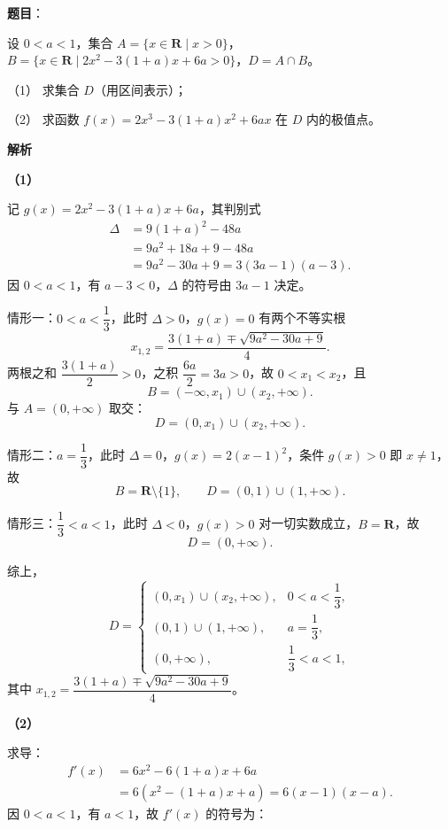 \begin{answer}

\textbf{题目}：

设 $0<a<1$，集合 $A=\{x\in\mathbf R\mid x>0\}$，$B=\{x\in\mathbf R\mid 2x^2-3(1+a)x+6a>0\}$，$D=A\cap B$。

（1） 求集合 $D$（用区间表示）；

（2） 求函数 $f(x)=2x^3-3(1+a)x^2+6ax$ 在 $D$ 内的极值点。

\textbf{解析}

\textbf{（1）}

记 $g(x)=2x^2-3(1+a)x+6a$，其判别式
\nopagebreak[4]
\[\begin{aligned}
\Delta&=9(1+a)^2-48a\\
&=9a^2+18a+9-48a\\
&=9a^2-30a+9=3(3a-1)(a-3).
\end{aligned}\]
因 $0<a<1$，有 $a-3<0$，$\Delta$ 的符号由 $3a-1$ 决定。

情形一：$0<a<\dfrac13$，此时 $\Delta>0$，$g(x)=0$ 有两个不等实根
\nopagebreak[4]
\[x_{1,2}=\frac{3(1+a)\mp\sqrt{9a^2-30a+9}}{4}.\]
两根之和 $\dfrac{3(1+a)}{2}>0$，之积 $\dfrac{6a}{2}=3a>0$，故 $0<x_1<x_2$，且
\nopagebreak[4]
\[B=(-\infty,x_1)\cup(x_2,+\infty).\]
与 $A=(0,+\infty)$ 取交：
\nopagebreak[4]
\[D=(0,x_1)\cup(x_2,+\infty).\]

情形二：$a=\dfrac13$，此时 $\Delta=0$，$g(x)=2\left(x-1\right)^2$，条件 $g(x)>0$ 即 $x\neq1$，故
\nopagebreak[4]
\[B=\mathbf R\setminus\{1\},\qquad D=(0,1)\cup(1,+\infty).\]

情形三：$\dfrac13<a<1$，此时 $\Delta<0$，$g(x)>0$ 对一切实数成立，$B=\mathbf R$，故
\nopagebreak[4]
\[D=(0,+\infty).\]

综上，
\nopagebreak[4]
\[D=\begin{cases}
(0,x_1)\cup(x_2,+\infty), & 0<a<\dfrac13,\\[1mm]
(0,1)\cup(1,+\infty), & a=\dfrac13,\\[1mm]
(0,+\infty), & \dfrac13<a<1,
\end{cases}\]
其中 $x_{1,2}=\dfrac{3(1+a)\mp\sqrt{9a^2-30a+9}}4$。

\textbf{（2）}

求导：
\nopagebreak[4]
\[\begin{aligned}
f'(x)&=6x^2-6(1+a)x+6a\\
&=6\left(x^2-(1+a)x+a\right)=6(x-1)(x-a).
\end{aligned}\]
因 $0<a<1$，有 $a<1$，故 $f'(x)$ 的符号为：


\end{answer}
